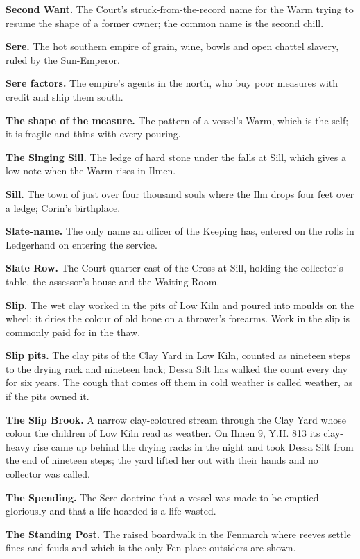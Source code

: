 \documentclass{design/chronicle}
\begin{document}
\textbf{Second Want.} The Court’s struck-from-the-record name for the Warm trying to resume the shape of a former owner; the common name is the second chill.

\textbf{Sere.} The hot southern empire of grain, wine, bowls and open chattel slavery, ruled by the Sun-Emperor.

\textbf{Sere factors.} The empire’s agents in the north, who buy poor measures with credit and ship them south.

\textbf{The shape of the measure.} The pattern of a vessel’s Warm, which is the self; it is fragile and thins with every pouring.

\textbf{The Singing Sill.} The ledge of hard stone under the falls at Sill, which gives a low note when the Warm rises in Ilmen.

\textbf{Sill.} The town of just over four thousand souls where the Ilm drops four feet over a ledge; Corin’s birthplace.

\textbf{Slate-name.} The only name an officer of the Keeping has, entered on the rolls in Ledgerhand on entering the service.

\textbf{Slate Row.} The Court quarter east of the Cross at Sill, holding the collector’s table, the assessor’s house and the Waiting Room.

\textbf{Slip.} The wet clay worked in the pits of Low Kiln and poured into moulds on the wheel; it dries the colour of old bone on a thrower’s forearms. Work in the slip is commonly paid for in the thaw.

\textbf{Slip pits.} The clay pits of the Clay Yard in Low Kiln, counted as nineteen steps to the drying rack and nineteen back; Dessa Silt has walked the count every day for six years. The cough that comes off them in cold weather is called weather, as if the pits owned it.

\textbf{The Slip Brook.} A narrow clay-coloured stream through the Clay Yard whose colour the children of Low Kiln read as weather. On Ilmen 9, Y.H. 813 its clay-heavy rise came up behind the drying racks in the night and took Dessa Silt from the end of nineteen steps; the yard lifted her out with their hands and no collector was called.

\textbf{The Spending.} The Sere doctrine that a vessel was made to be emptied gloriously and that a life hoarded is a life wasted.

\textbf{The Standing Post.} The raised boardwalk in the Fenmarch where reeves settle fines and feuds and which is the only Fen place outsiders are shown.
\end{document}
